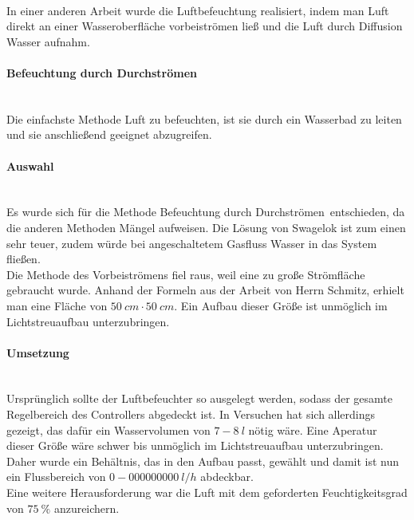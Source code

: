 \hfill \\

In einer anderen Arbeit \cite{Fallturmexperiment} wurde die Luftbefeuchtung realisiert, indem man Luft direkt an einer  Wasseroberfläche vorbeiströmen ließ und die Luft durch Diffusion Wasser aufnahm. 

\paragraph{Befeuchtung durch Durchströmen}
\hfill \\

Die einfachste Methode Luft zu befeuchten, ist sie durch ein Wasserbad zu leiten und sie anschließend geeignet abzugreifen.


\paragraph{Auswahl}

\hfill \\

Es wurde sich für die Methode \glqq Befeuchtung durch Durchströmen\grqq \ entschieden, da die anderen Methoden Mängel aufweisen. Die Lösung von Swagelok ist zum einen sehr teuer, zudem würde bei angeschaltetem Gasfluss Wasser in das System fließen. \\
Die Methode des Vorbeiströmens fiel raus, weil eine zu große Strömfläche gebraucht wurde. Anhand der Formeln aus der Arbeit von Herrn Schmitz, erhielt man eine Fläche von $\SI{50}{cm} \cdot \SI{50}{cm}$. Ein Aufbau dieser Größe ist unmöglich im Lichtstreuaufbau unterzubringen.

\paragraph{Umsetzung}

\hfill \\

Ursprünglich sollte der Luftbefeuchter so ausgelegt werden, sodass der gesamte Regelbereich des Controllers abgedeckt ist. In Versuchen hat sich allerdings gezeigt, das dafür ein Wasservolumen von $7 - \SI{8}{l} $ nötig wäre. Eine Aperatur dieser Größe wäre schwer bis unmöglich im Lichtstreuaufbau unterzubringen. Daher wurde ein Behältnis, das in den Aufbau passt, gewählt und damit ist nun ein Flussbereich von $0 - \SI{000000000}{l/h}$ abdeckbar. \\
Eine weitere Herausforderung war die Luft mit dem geforderten Feuchtigkeitsgrad von $\SI{75}{\%}$ anzureichern. \\

